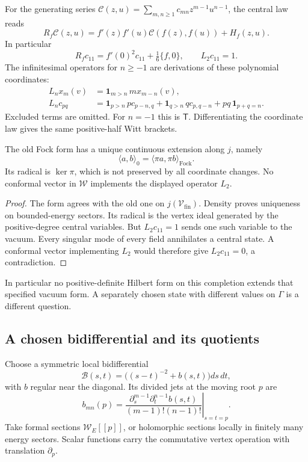 For the generating series
\(\mathcal C(z,u)=\sum_{m,n\geq1}c_{mn}z^{m-1}u^{n-1}\),
the central law reads
\begin{equation}\label{v4-eq:singular-central-bidifferential}
 R_f\mathcal C(z,u)=
       f'(z)f'(u)\mathcal C(f(z),f(u))+H_f(z,u).
\end{equation}
In particular
\[
 R_fc_{11}=f'(0)^2c_{11}+\tfrac16\{f,0\},
 \qquad L_2c_{11}=1.
\]
The infinitesimal operators for \(n\geq-1\)
are derivations of these polynomial coordinates:
\[
 \begin{aligned}
 L_nx_m(v)&=\mathbf1_{m>n}\,m x_{m-n}(v),\\
 L_nc_{pq}&=\mathbf1_{p>n}\,p c_{p-n,q}
           +\mathbf1_{q>n}\,q c_{p,q-n}
           +pq\,\mathbf1_{p+q=n}.
 \end{aligned}
\]
Excluded terms are omitted. For \(n=-1\)
this is \(\mathsf T\). Differentiating
the coordinate law gives the same
positive-half Witt brackets.

\begin{proposition}\label{v4-prop:singular-vacuum-radical}
The old Fock form has a unique continuous
extension along \(j\), namely
\[
             \langle a,b\rangle_0
                  =\langle\pi a,\pi b\rangle_{\mathrm{Fock}}.
\]
Its radical is \(\ker\pi\), which is not
preserved by all coordinate changes.
No conformal vector in \(\mathcal W\)
implements the displayed operator \(L_2\).
\end{proposition}

\begin{proof}
The form agrees with the old one on
\(j(\mathcal V_{\mathrm{fin}})\). Density
proves uniqueness on bounded-energy
sectors. Its radical is the vertex ideal
generated by the positive-degree central
variables. But \(L_2c_{11}=1\) sends
one such variable to the vacuum.
Every singular mode of every field
annihilates a central state. A conformal
vector implementing \(L_2\) would
therefore give \(L_2c_{11}=0\), a contradiction.
\end{proof}

In particular no positive-definite Hilbert
form on this completion extends that
specified vacuum form. A separately chosen
state with different values on \(\Gamma\)
is a different question.

\subsection{A chosen bidifferential and its quotients}

Choose a symmetric local bidifferential
\[
 \mathcal B(s,t)=\bigl((s-t)^{-2}+b(s,t)\bigr)ds\,dt,
\]
with \(b\) regular near the diagonal.
Its divided jets at the moving root \(p\) are
\[
 b_{mn}(p)=
 \left.\frac{\partial_s^{m-1}\partial_t^{n-1}b(s,t)}
                {(m-1)!(n-1)!}\right|_{s=t=p}.
\]
Take formal sections \(\mathcal W_E[[p]]\),
or holomorphic sections locally in finitely
many energy sectors. Scalar functions
carry the commutative vertex operation
with translation \(\partial_p\).

